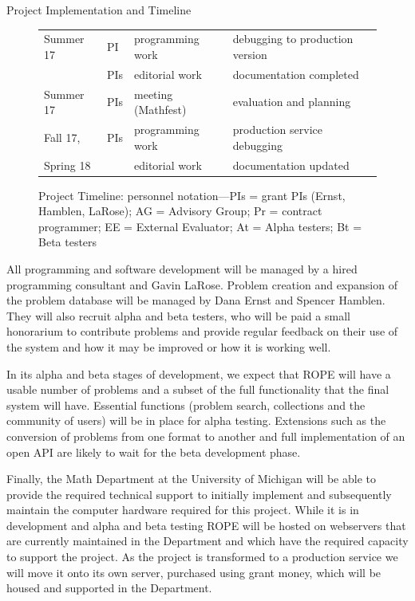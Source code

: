 \documentclass[11pt]{article}
\begin{document}
\begin{section}{Project Implementation and Timeline}
\begin{figure}
\begin{center}
\begin{tabular}{|l|l|l|l|}
  \hline
  Summer 17 & PI & programming work & debugging to
	production version \\ 
	& PIs & editorial work & documentation completed \\
  Summer 17 & PIs & meeting (Mathfest) & evaluation and planning \\
  \hline
  Fall 17, & PIs & programming work & production service debugging\\
  Spring 18 & & editorial work & documentation updated \\ 
  \hline
\end{tabular}
\caption{Project Timeline: personnel notation---PIs = grant PIs (Ernst,
  Hamblen, LaRose); AG = Advisory Group; Pr = contract programmer; EE =
  External Evaluator; At = Alpha testers; Bt = Beta testers}
\label{timeline}
\end{center}
\end{figure}

All programming and software development will be managed by a hired
programming consultant and Gavin LaRose.  Problem creation and expansion
of the problem database will be managed by Dana Ernst and Spencer
Hamblen.  They will also recruit alpha and beta testers, who will be paid
a small honorarium to contribute problems and provide regular feedback on
their use of the system and how it may be improved or how it is working
well.

In its alpha and beta stages of development, we expect that ROPE will have
a usable number of problems and a subset of the full functionality that
the final system will have.  Essential functions (problem search,
collections and the community of users) will be in place for alpha
testing.  Extensions such as the conversion of problems from one format to
another and full implementation of an
open API are likely to wait for the beta development phase.

Finally, the Math Department at the University of Michigan will be able to
provide the required technical support to initially implement and
subsequently maintain the computer hardware required for this project.
While it is in development and alpha and beta testing ROPE will be
hosted on webservers that are currently maintained in the Department and
which have the required capacity to support the project.  As the
project is transformed to a production service we will move it onto its
own server, purchased using grant money, which will be housed and
supported in the Department.

\end{section}
\end{document}
